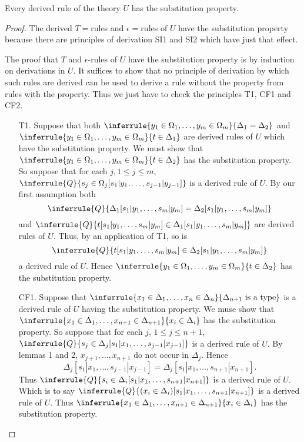 \begin{lemma}
Every derived rule of the theory $U$ has the substitution property.
\end{lemma}
\begin{proof}
  The derived $T=$rules and $\epsilon=$rules of $U$ have the substitution property because there are principles of derivation SI1 and SI2 which have just that effect.

  The proof that $T$ and $\epsilon$-rules of $U$ have the substitution property is by induction on derivations in $U$.
  It suffices to show that no principle of derivation by which such rules are derived can be used to derive a rule without the property from rules with the property.
  Thus we just have to check the principles T1, CF1 and CF2.

  \begin{enumerate}
  \item[T1.]
  Suppose that both $\inferrule{y_1\in\Omega_1,\ldots,y_m\in\Omega_m}{\Delta_1=\Delta_2}$ and $\inferrule{y_1\in\Omega_1,\ldots,y_m\in\Omega_m}{t\in\Delta_1}$ are derived rules of $U$ which have the substitution property.
  We must show that $\inferrule{y_1\in\Omega_1,\ldots,y_m\in\Omega_m}{t\in\Delta_2}$ has the substitution property.
  So suppose that for each $j, 1\leq j\leq m$, $\inferrule{Q}{s_j\in\Omega_j[s_1|y_1,\ldots,s_{j-1}|y_{j-1}]}$ is a derived rule of $U$.
  By our first assumption both 
  \[\inferrule{Q}{\Delta_1[s_1|y_1,\ldots,s_m|y_m]=\Delta_2[s_1|y_1,\ldots,s_m|y_m]}\] and $\inferrule{Q}{t[s_1|y_1,\ldots,s_m|y_m]\in\Delta_1[s_1|y_1,\ldots,s_m|y_m]}$ are derived rules of $U$.
  Thus, by an application of T1, so is 
  \[\inferrule{Q}{t[s_1|y_1,\ldots,s_m|y_m]\in\Delta_2[s_1|y_1,\ldots,s_m|y_m]}\] a derived rule of $U$.
  Hence $\inferrule{y_1\in\Omega_1,\ldots,y_m\in\Omega_m}{t\in\Delta_2}$ has the substitution property.

  \item[CF1.]
  Suppose that $\inferrule{x_1\in\Delta_1,\ldots,x_n\in\Delta_n}{\Delta_{n+1}\isatype}$ is a derived rule of $U$ having the substitution property.
  We muse show that $\inferrule{x_1\in\Delta_1,\ldots,x_{n+1}\in\Delta_{n+1}}{x_i\in\Delta_i}$ has the substitution property.
  So suppose that for each $j$, $1\leq j\leq n+1$, $\inferrule{Q}{s_j\in\Delta_j[s_1|x_1,\ldots,s_{j-1}|x_{j-1}]}$ is a derived rule of $U$.
  By lemmas 1 and 2, $x_{j+1},\ldots,x_{n+1}$ do not occur in $\Delta_j$.
  Hence 
  \[\Delta_j[s_1|x_1,\ldots,s_{j-1}|x_{j-1}]=\Delta_j[s_1|x_1,\ldots,s_{n+1}|x_{n+1}].\]
  Thus $\inferrule{Q}{s_i\in\Delta_i[s_1|x_1,\ldots,s_{n+1}|x_{n+1}]}$ is a derived rule of $U$.
  Which is to say $\inferrule{Q}{(x_i\in\Delta_i)[s_1|x_1,\ldots,s_{n+1}|x_{n+1}]}$ is a derived rule of $U$.
  Thus $\inferrule{x_1\in\Delta_1,\ldots,x_{n+1}\in\Delta_{n+1}}{x_i\in\Delta_i}$ has the substitution property.


\end{enumerate}
\end{proof}
